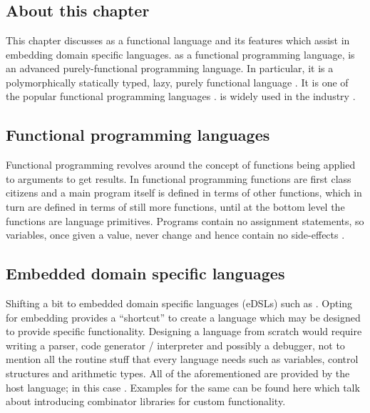 \documentclass[thesis-solanki.tex]{subfiles}
\begin{document}
\chapter{}\label{chap:hwh}


\section{About this chapter}
This chapter discusses  as a functional language and its features which assist in embedding domain specific languages.
 as a functional programming language, is an advanced purely-functional
programming language.
In particular, it is a polymorphically statically typed, lazy, purely functional language
\cite{website:haskellwiki}.
It is one of the popular functional programming languages \cite{website:langpop}.
 is widely used in the industry \cite{website:haskellinindustry}.
  
\section{Functional programming languages}
Functional programming revolves around the concept of functions being applied to arguments to get results.
In functional programming functions are first class citizens and a main program itself is defined in terms of other
functions, which in turn are defined in terms of still more functions, until at the bottom level the functions are
language primitives.
Programs contain no assignment statements, so variables, once given a value, never change and hence contain no
side-effects \cite{hughes1989functional}.


\section{Embedded domain specific languages}
  Shifting a bit to embedded domain specific languages (eDSLs) such as .
  Opting for embedding provides a ``shortcut'' to create a language which may be designed to provide specific
  functionality.
  Designing a language from scratch would require writing a parser, code generator / interpreter and possibly a
  debugger, not to mention all the routine stuff that every language
  needs such as variables, control structures and 
  arithmetic types.
  All of the aforementioned are provided by the host language; in this case .
  Examples for the same can be found here \cite{jones2001composing, meyer2008eiffel} which talk about introducing
  combinator libraries for custom functionality.
\end{document}

